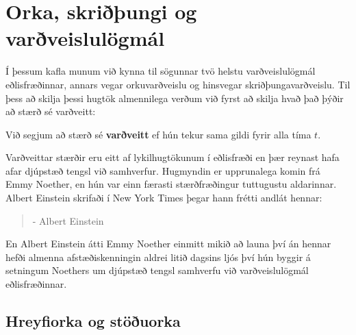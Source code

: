 \ifdefined \wholebook \else\documentclass[oneside]{book}\usepackage{EdlBook}\graphicspath{{figures/}}
\begin{document}
%
\setcounter{chapter}{3} %
%
\fi

\renewcommand{\thefigure}{\arabic{figure}}

\chapter{Orka, skriðþungi og varðveislulögmál}

Í þessum kafla munum við kynna til sögunnar tvö helstu varðveislulögmál eðlisfræðinnar, annars vegar orkuvarðveislu og hinsvegar skriðþungavarðveislu. Til þess að skilja þessi hugtök almennilega verðum við fyrst að skilja hvað það þýðir að stærð sé varðveitt:

\begin{tcolorbox}
\begin{definition}
Við segjum að stærð sé \textbf{varðveitt} ef hún tekur sama gildi fyrir alla tíma $t$.
\end{definition}
\end{tcolorbox}

Varðveittar stærðir eru eitt af lykilhugtökunum í eðlisfræði en þær reynast hafa afar djúpstæð tengsl við samhverfur. Hugmyndin er upprunalega komin frá Emmy Noether, en hún var einn færasti stærðfræðingur tuttugustu aldarinnar. Albert Einstein skrifaði í New York Times þegar hann frétti andlát hennar:

\begin{quote}
    \textit{}
    \begin{flushright}
    - Albert Einstein
    \end{flushright}
\end{quote}
En Albert Einstein átti Emmy Noether einmitt mikið að launa því án hennar hefði almenna afstæðiskenningin aldrei litið dagsins ljós því hún byggir á setningum Noethers um djúpstæð tengsl samhverfu við varðveislulögmál eðlisfræðinnar.

\section{Hreyfiorka og stöðuorka}
\end{document}
